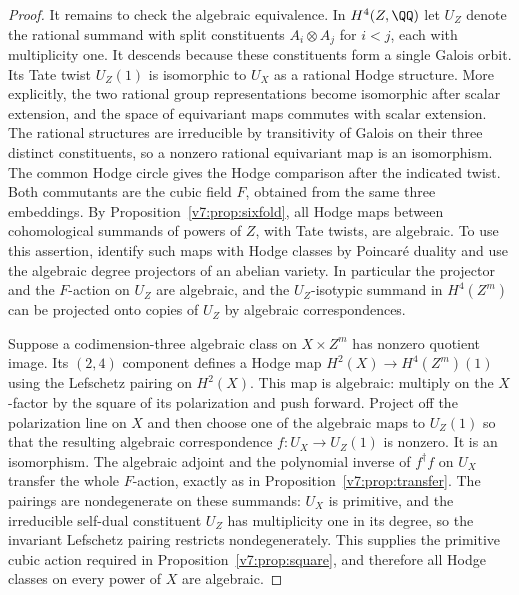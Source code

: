 \begin{proof}
It remains to check the algebraic equivalence. In $H^4(Z,\QQ)$ let
$U_Z$ denote the rational summand with split constituents
$A_i\otimes A_j$ for $i<j$, each with multiplicity one. It descends
because these constituents form a single Galois orbit. Its Tate twist
$U_Z(1)$ is isomorphic to $U_X$ as a rational Hodge structure. More
explicitly, the two rational group representations become isomorphic
after scalar extension, and the space of equivariant maps commutes
with scalar extension. The rational structures are irreducible by
transitivity of Galois on their three distinct constituents, so a
nonzero rational equivariant map is an isomorphism. The common Hodge
circle gives the Hodge comparison after the indicated twist. Both
commutants are the cubic field $F$, obtained from the same three
embeddings. By Proposition~\ref{v7:prop:sixfold}, all Hodge maps
between cohomological summands of powers of $Z$, with Tate twists, are
algebraic. To use this assertion, identify such maps with Hodge classes
by Poincar\'e duality and use the algebraic degree projectors of an
abelian variety. In particular the projector and the $F$-action on
$U_Z$ are algebraic, and the $U_Z$-isotypic summand in $H^4(Z^m)$ can
be projected onto copies of $U_Z$ by algebraic correspondences.

Suppose a codimension-three algebraic class on $X\times Z^m$ has
nonzero quotient image. Its $(2,4)$ component defines a Hodge map
$H^2(X)\to H^4(Z^m)(1)$ using the Lefschetz pairing on $H^2(X)$.
This map is algebraic: multiply on the $X$-factor by the square of
its polarization and push forward. Project off the polarization
line on $X$ and then choose one of the algebraic maps to $U_Z(1)$
so that the resulting algebraic correspondence $f:U_X\to U_Z(1)$
is nonzero. It is an isomorphism. The algebraic adjoint and the
polynomial inverse of $f^\dagger f$ on $U_X$ transfer the whole
$F$-action, exactly as in Proposition~\ref{v7:prop:transfer}.
The pairings are nondegenerate on these summands: $U_X$ is primitive,
and the irreducible self-dual constituent $U_Z$ has multiplicity one
in its degree, so the invariant Lefschetz pairing restricts
nondegenerately. This supplies the primitive cubic action required in
Proposition~\ref{v7:prop:square}, and therefore all Hodge classes on
every power of $X$ are algebraic.


\end{proof}

